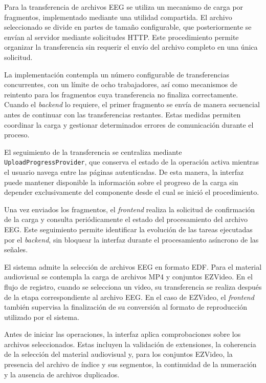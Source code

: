 Para la transferencia de archivos EEG se
utiliza un mecanismo de carga por fragmentos,
implementado mediante una utilidad compartida.
El archivo seleccionado se divide en partes
de tamaño configurable, que posteriormente
se envían al servidor mediante solicitudes
HTTP. Este procedimiento permite organizar
la transferencia sin requerir el envío
del archivo completo en una única solicitud.

La implementación contempla un número
configurable de transferencias concurrentes,
con un límite de ocho trabajadores, así
como mecanismos de reintento para los
fragmentos cuya transferencia no finaliza
correctamente. Cuando el \textit{backend} lo requiere,
el primer fragmento se envía de manera
secuencial antes de continuar con las
transferencias restantes. Estas medidas
permiten coordinar la carga y gestionar
determinados errores de comunicación
durante el proceso.

El seguimiento de la transferencia se
centraliza mediante
\texttt{UploadProgressProvider}, que conserva
el estado de la operación activa mientras
el usuario navega entre las páginas
autenticadas. De esta manera, la interfaz
puede mantener disponible la información
sobre el progreso de la carga sin depender
exclusivamente del componente desde el
cual se inició el procedimiento.

Una vez enviados los fragmentos, el \textit{frontend}
realiza la solicitud de confirmación de la
carga y consulta periódicamente el estado
del procesamiento del archivo EEG. Este
seguimiento permite identificar la evolución
de las tareas ejecutadas por el \textit{backend},
sin bloquear la interfaz durante el
procesamiento asíncrono de las señales.

El sistema admite la selección de archivos
EEG en formato EDF. Para el material
audiovisual se contempla la carga de archivos
MP4 y conjuntos EZVideo. En el flujo de
registro, cuando se selecciona un video,
su transferencia se realiza después de la
etapa correspondiente al archivo EEG.
En el caso de EZVideo, el \textit{frontend} también
supervisa la finalización de su conversión
al formato de reproducción utilizado
por el sistema.

Antes de iniciar las operaciones, la
interfaz aplica comprobaciones sobre los
archivos seleccionados. Estas incluyen
la validación de extensiones, la coherencia
de la selección del material audiovisual
y, para los conjuntos EZVideo, la presencia
del archivo de índice y sus segmentos,
la continuidad de la numeración y la
ausencia de archivos duplicados.

